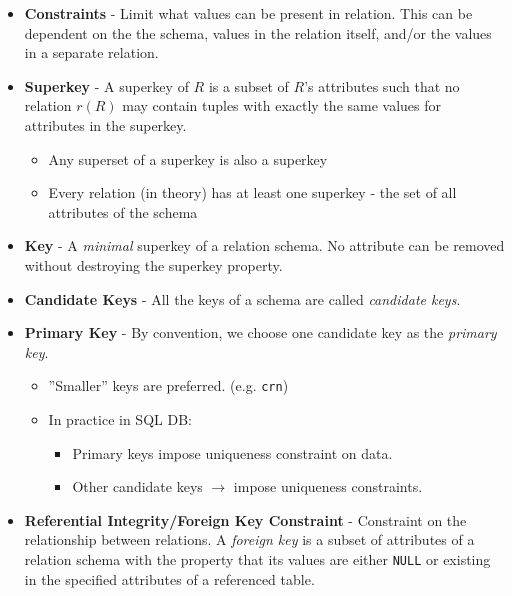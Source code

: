 \documentclass{../cheatsheet}
\begin{document}
\begin{multicols*}{2}
\begin{itemize}
        \item \textbf{Constraints} -
            Limit what values can be present in relation. This can be dependent
            on the the schema, values in the relation itself, and/or the values in a 
            separate relation.

        \item \textbf{Superkey} -
            A superkey of $R$ is a subset of $R$'s
            attributes such that no relation $r(R)$ may contain tuples with
            exactly the same values for attributes in the superkey.
            \begin{itemize}
                \item Any superset of a superkey is also a superkey
                \item Every relation (in theory) has at least one superkey - the
                    set of all attributes of the schema
            \end{itemize}

        \item \textbf{Key} - A \textit{minimal} superkey of a relation schema. 
            No attribute can be removed without destroying the superkey property.

        \item \textbf{Candidate Keys} - All the keys of a schema are called
            \textit{candidate keys}.

        \item \textbf{Primary Key} - By convention, we choose one candidate key
            as the \textit{primary key}.

            \begin{itemize}
                \item ''Smaller'' keys are preferred. (e.g. \texttt{crn})
                \item In practice in SQL DB:
                    \begin{itemize}
                        \item Primary keys impose uniqueness constraint on data.
                        \item Other candidate keys $\rightarrow$ impose
                            uniqueness constraints.
                    \end{itemize}
            \end{itemize}

        \item \textbf{Referential Integrity/Foreign Key Constraint} - Constraint
            on the relationship between relations. A \textit{foreign key} is a
            subset of attributes of a relation schema with the property that its
            values are either \texttt{NULL} or existing in the specified
            attributes of a referenced table.
    \end{itemize}


\end{multicols*}
\end{document}
